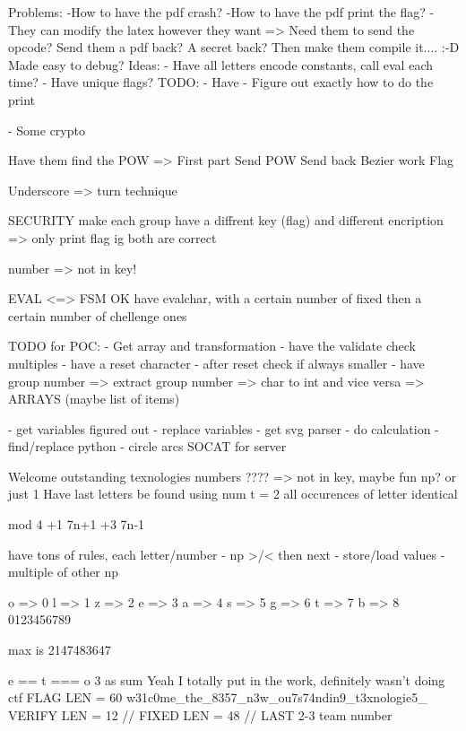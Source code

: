 Problems:
-How to have the pdf crash?
-How to have the pdf print the flag?
-They can modify the latex however they want => Need them to send the opcode? Send them a pdf back? A secret back? Then make them compile it.... :-D
 Made easy to debug? 
Ideas:
- Have all letters encode constants, call eval each time?
- Have unique flags?
TODO:
- Have 
- Figure out exactly how to do the print 

       
       
- Some crypto

Have them find the POW
    => First part 
Send POW
Send back Bezier work
Flag

Underscore => turn technique



SECURITY make each group have a diffrent key (flag) and different encription
    => only print flag ig both are correct
    
number => not in key!

EVAL <=> FSM
OK have eval{char}, with a certain number of fixed then a certain number of chellenge ones

TODO for POC:
- Get array and transformation
- have the validate check multiples
- have a reset character
- after reset check if always smaller
- have group number
=> extract group number
=> char to int and vice versa
=> ARRAYS (maybe list of items)



 - get variables figured out
 - replace variables
 - get svg parser
 - do calculation
 - find/replace python
 - circle arcs 
SOCAT for server

Welcome
outstanding  
texnologies
numbers ???? => not in key, maybe fun np? or just 1
Have last letters be found using num 
t = 2
all occurences of letter identical

 mod 4 +1 7n+1 +3 7n-1
 
 have tons of rules, each letter/number 
 - np >/< then next
 - store/load values
 - multiple of other np
  
o => 0
l => 1
z => 2
e => 3
a => 4
s => 5
g => 6
t => 7
b => 8
0123456789

max is 2147483647

e == t === o
3 as sum
Yeah I totally put in the work, definitely wasn't doing ctf FLAG LEN = 60 
w31c0me_the_8357_n3w_ou7s74ndin9_t3xnologie5_  VERIFY LEN = 12 // FIXED LEN = 48 // LAST 2-3 team number

